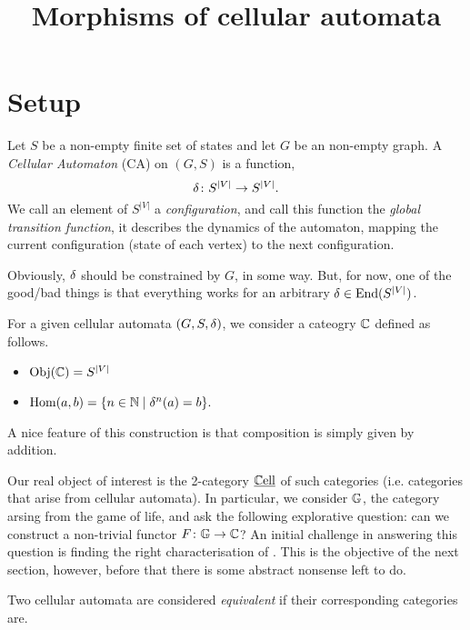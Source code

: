 \message{ !name(cell-cat.tex)}\documentclass[11pt,a4paper]{amsart}
\title{Morphisms of cellular automata}
\begin{document}


\maketitle

\section{Setup}

Let $S$ be a non-empty finite set of states and let $G$ be an non-empty graph. A \emph{Cellular Automaton} (CA) on $(G,S)$ is a function,
$$\delta \colon S^{|V|} \rightarrow S^{|V|}.$$
We call an element of $S^{|V|}$ a \emph{configuration}, and call this function the \emph{global transition function}, it describes the dynamics of the automaton, mapping the current configuration (state of each vertex) to the next configuration. 

\begin{REM}
  \label{rem:contraints}
  Obviously, $\delta$ should be constrained by $G$, in some way. But, for now, one of the good/bad things is that everything works for an arbitrary $\delta \in \operatorname{End}(S^{|V|})$.
\end{REM}

For a given cellular automata $(G,S,\delta)$, we consider a cateogry $\mathbb{C}$ defined as follows. 
\begin{itemize}
\item $\operatorname{Obj}(\mathbb{C}) = S^{|V|}$
\item $\operatorname{Hom}(a,b) = \{n \in \mathbb{N} \mid \delta^n(a)=b \}.$
\end{itemize}
A nice feature of this construction is that composition is simply given by addition.

Our real object of interest is the 2-category $\operatorname{\underline{\mathbb{C}ell}}$  of such categories (i.e. categories that arise from cellular automata). In particular, we consider $\mathbb{G}$, the category arsing from the game of life, and ask the following explorative question: can we construct a non-trivial functor $F \colon \mathbb{G} \to \mathbb{C}$? An initial challenge in answering this question is finding the right characterisation of . This is the objective of the next section, however, before that there is some abstract nonsense left to do.

\begin{DEF}
  \label{def:equivalent-automata}
  Two cellular automata are considered \emph{equivalent} if their corresponding categories are. 
\end{DEF}
\end{document}

